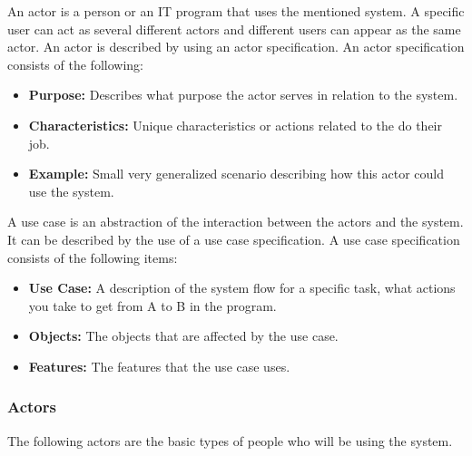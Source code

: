 An actor is a person or an IT program that uses the mentioned system. A specific user can act as several different actors and different users can appear as the same actor. An actor is described by using an actor specification. An actor specification consists of the following:

\begin{itemize}
    \item \textbf{Purpose:} Describes what purpose the actor serves in relation to the system.
    \item \textbf{Characteristics:} Unique characteristics or actions related to the do their job.
    \item \textbf{Example:} Small very generalized scenario describing how this actor could use the system.
\end{itemize}

A use case is an abstraction of the interaction between the actors and the system. It can be described by the use of a use case specification. A use case specification consists of the following items:
\begin{itemize}
    \item \textbf{Use Case:} A description of the system flow for a specific task, what actions you take to get from A to B in the program.
    \item \textbf{Objects:} The objects that are affected by the use case. 
    \item \textbf{Features:} The features that the use case uses. 
\end{itemize}


\subsubsection{Actors}

The following actors are the basic types of people who will be using the system. \\


